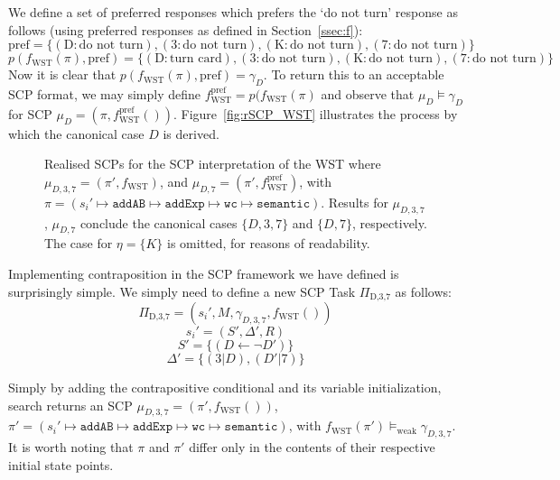 We define a set of preferred responses which prefers the `do not turn' response as follows (using preferred responses as defined in Section~\ref{ssec:f}):
\[
\text{pref}=\{(\text{D}:\text{do not turn}),(\text{3}:\text{do not turn}),(\text{K}:\text{do not turn}),(\text{7}:\text{do not turn})\}
\]
\[
p(f_\text{WST}(\pi),\text{pref})=\{(\text{D}:\text{turn card}),(\text{3}:\text{do not turn}),(\text{K}:\text{do not turn}),(\text{7}:\text{do not turn})\}
\]
Now it is clear that $p(f_\text{WST}(\pi),\text{pref})= \gamma_D$. To return this to an acceptable SCP format, we may simply define $f_\text{WST}^\text{pref}=p(f_\text{WST}(\pi)$ and observe that $\mu_D \models \gamma_D$ for SCP $\mu_D=(\pi, f_\text{WST}^\text{pref}())$. Figure~\ref{fig:rSCP_WST} illustrates the process by which the canonical case $D$ is derived.


\begin{figure}

\caption{Realised SCPs for the SCP interpretation of the WST where $\mu_{D,3,7}=(\pi',f_\text{WST})$, and $\mu_{D,7}=(\pi',f_\text{WST}^\text{pref})$, with $\pi=(s_i' \longmapsto \texttt{addAB} \longmapsto \texttt{addExp}  \longmapsto \texttt{wc} \longmapsto \texttt{semantic})$.  Results for $\mu_{D,3,7}$, $\mu_{D,7}$ conclude the canonical cases $\{D,3,7\}$ and $\{D,7\}$, respectively. The case for $\eta=\{K\}$ is omitted, for reasons of readability.}
\label{fig:realisedSCPsWST_mod}
\end{figure}


Implementing contraposition in the SCP framework we have defined is surprisingly simple. We simply need to define a new SCP Task $\Pi_\text{D,3,7}$ as follows:
\[
\Pi_\text{D,3,7} = (s_i', M, \gamma_{D,3,7}, f_\text{WST}())
\]
\[
s_i'=(S', \Delta', R)
\]
\[
S'=\{(D \leftarrow \lnot D')\}
\]
\[
\Delta'=\{(3|D),(D'|7)\}
\]

Simply by adding the contrapositive conditional and its variable initialization, search returns an SCP $\mu_{D,3,7}=(\pi', f_\text{WST}())$, $\pi'=(s_i' \longmapsto \texttt{addAB} \longmapsto \texttt{addExp} \longmapsto \texttt{wc} \longmapsto \texttt{semantic})$, with $f_\text{WST}(\pi')\models_\text{weak} \gamma_{D,3,7}$. It is worth noting that $\pi$ and $\pi'$ differ only in the contents of their respective initial state points.


